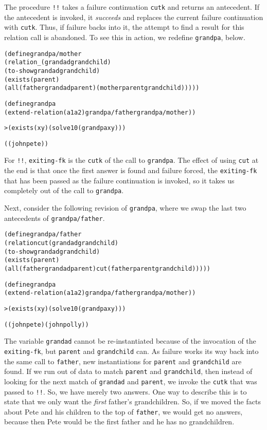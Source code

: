 The procedure \texttt{!!} takes a failure continuation \texttt{cutk}
and returns an antecedent.  If the antecedent is invoked, it
\emph{succeeds} and replaces the current failure continuation with
\texttt{cutk}.  Thus, if failure backs into it, the attempt to find a
result for this relation call is abandoned.  To see this in action,
we redefine \texttt{grandpa}, below.

\begin{alltt}
(define grandpa/mother
  (relation _ (grandad grandchild)
    (to-show grandad grandchild)
    (exists (parent)
      (all (father grandad parent) (mother parent grandchild)))))

(define grandpa
  (extend-relation (a1 a2) grandpa/father grandpa/mother))
\end{alltt}

\begin{alltt}
> (exists (x y) (solve 10 (grandpa x y)))

((john pete))
\end{alltt}

For \texttt{!!}, \texttt{exiting-fk} is the \texttt{cutk} of the
call to \texttt{grandpa}.  The effect of using \texttt{cut} at
the end is that once the first answer is found and failure forced, the
\texttt{exiting-fk} that has been passed as the failure continuation is
invoked, so it takes us completely out of the call to
\texttt{grandpa}.

Next, consider the following revision of \texttt{grandpa}, where
we swap the last two antecedents of \texttt{grandpa/father}.

\begin{alltt}
(define grandpa/father
  (relation cut (grandad grandchild)
    (to-show grandad grandchild)
    (exists (parent)
      (all (father grandad parent) cut (father parent grandchild)))))

(define grandpa
  (extend-relation (a1 a2) grandpa/father grandpa/mother))
\end{alltt}
\begin{alltt}
> (exists (x y) (solve 10 (grandpa x y)))

((john pete) (john polly))
\end{alltt}

\noindent 
The variable \texttt{grandad} cannot be re-instantiated because of the
invocation of the \texttt{exiting-fk}, but \texttt{parent} and
\texttt{grandchild} can. As failure works its way back into the same
call to \texttt{father}, new instantiations for \texttt{parent} and
\texttt{grandchild} are found.  If we run out of data to match
\texttt{parent} and \texttt{grandchild}, then instead of looking for
the next match of \texttt{grandad} and \texttt{parent}, we invoke the
\texttt{cutk} that was passed to \texttt{!!}. So, we have merely two
answers.  One way to describe this is to state that we only want the
\emph{first} father's grandchildren. So, if we moved the facts about
Pete and his children to the top of \texttt{father}, we would get no
answers, because then Pete would be the first father and he has no
grandchildren.

